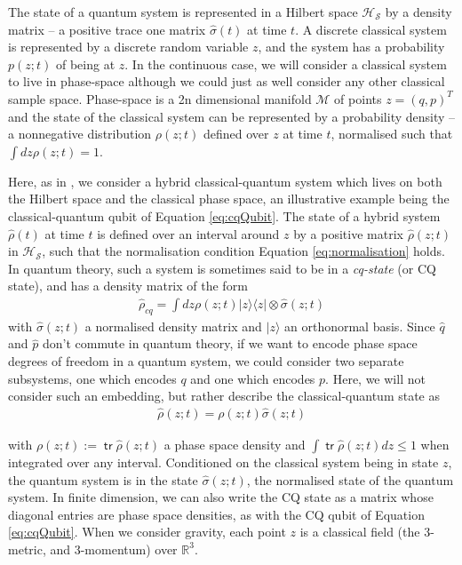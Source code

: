 \documentclass[aps,pra,showpacs,citeautoscript,amsmath,amssymb,floatfix,superscriptaddress,bbm, verbatim,amsfonts,changes,12pt,nofootinbib,longbibliography]{revtex4-2}
\newcommand{\tr}{\mathop{\mathsf{tr}}\nolimits}
\newcommand{\ket}[1]{|#1\rangle}
\newcommand{\proj}[1]{|#1\rangle\!\langle#1|}
\def\p{{\bf p}_{\vec k}}
\def\z{{z}}
\def\q{{q}}
\def\p{{p}}
\renewcommand{\varrho}{\hat{\rho}}
\def\cqstate{\varrho}
\def\psiz{{\varrho(\z;t)}}
\begin{document}
The state of a quantum system is represented in a Hilbert space $\mathcal{H_S}$ by a density matrix -- a positive trace one matrix $\hat{\sigma}(t)$ at time $t$.  A discrete %
classical system is represented by a discrete random variable $\z$, and the system has a probability $p(\z;t)$ of being at $\z$.  In the continuous case, we will consider a classical system to live in phase-space although we could just as well consider any other classical sample space. Phase-space is a 2n dimensional manifold ${\mathcal M}$ of points $\z=(\q,\p)^T$ and the state of the classical system can be represented by a probability density -- a nonnegative distribution %
 $\rho(\z;t)$ defined over $\z$ at time $t$, normalised such that $\int d\z \rho(\z;t)=1$.

Here, as in \cite{aleksandrov1981statistical,gerasimenko1982dynamical, blanchard1993interaction,blanchard1995event,diosi1995quantum, diosi2014hybrid,alicki2003completely,poulinKITP}, we consider a hybrid classical-quantum system which lives on both the Hilbert space and the classical phase space, an illustrative example being the classical-quantum qubit of Equation \eqref{eq:cqQubit}. The state of a hybrid system $\cqstate(t)$ at time $t$ is defined over an interval around $\z$ by a positive  matrix $\cqstate(\z;t)$ in $\mathcal{H_S}$\cite{barb_foot}, such that the normalisation condition Equation \eqref{eq:normalisation} holds. 
In quantum theory, such a system is sometimes said to be in a {\it cq-state} (or CQ state), and has a density matrix of the form %
\begin{align}
\varrho_{cq}=\int d\z\rho(\z;t)\proj{\z}\otimes\hat{\sigma}({\z;t})  
\label{eq:cq-state}
\end{align}
with $\hat{\sigma}(\z;t)$ a normalised density matrix and $\ket{\z}$ an orthonormal basis.
Since $\hat{q}$ and $\hat{p}$ don't commute in quantum theory, if we want to 
encode phase space degrees of freedom in a quantum system, we could consider two separate subsystems, one which encodes $q$ and one which encodes $p$.\label{ft:embed}
Here, we will not consider such an embedding, but rather describe the classical-quantum
 state as 
 \begin{align}
 \cqstate(\z;t)=\rho(\z;t)\hat{\sigma}(\z;t)
 \label{eq:cqRef3}
 \end{align}

with %
 $\rho(\z;t):=\tr\psiz$ a phase space density and $\int\tr\psiz d\z \leq 1$ when integrated over any interval.\label{par:subnormal} 
Conditioned on the classical system being in state $\z$, the quantum system is in the state $\hat{\sigma}(\z;t)$, the normalised state of the quantum system. In finite dimension, we can also write the CQ state as a matrix whose diagonal entries are phase space densities, as with the CQ qubit of Equation \eqref{eq:cqQubit}.
When we consider gravity,
each point $\z$ is a classical field (the 3-metric, and 3-momentum) over $\mathbb{R}^3$.
\end{document}
